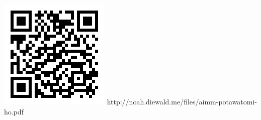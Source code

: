 \documentclass[letter,12pt]{article}
\begin{document}
\begin{multicols}{2}
  \maketitle
  \begin{minipage}{.3\textwidth}
    \includegraphics{tex/figures/ho-qrcode}
    \footnotesize
    http://noah.diewald.me/files/aimm-potawatomi-ho.pdf
  \end{minipage}
\end{multicols}


%
%
%
%
%
%
%


% 

\printbibliography
\end{document}
